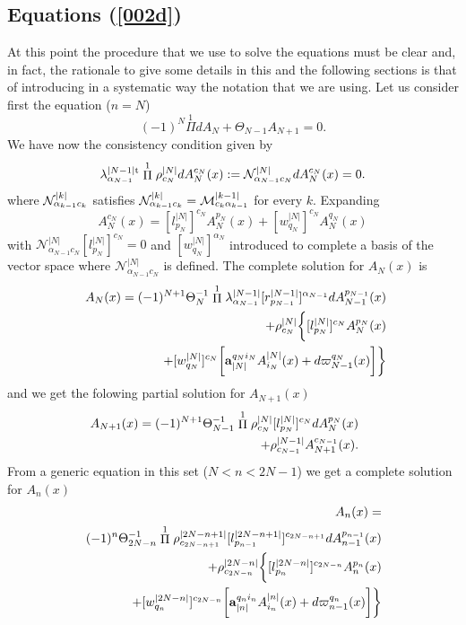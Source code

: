 \documentclass[prd,a4paper,twocolumn,amssymb,amsmath,nofootinbib,showpacs]{revtex4}
\begin{document}
\subsection{\label{Eq4} Equations (\ref{002d})}
At this point the procedure that we use to solve the equations
must be clear and, in fact, the rationale to give some details in
this and the following sections is that of introducing in a
systematic way the notation that we are using. Let us consider
first the equation ($n=N$)
$$
(-1)^N\stackrel{1}{\Pi}dA_N+ \Theta_{N-1}A_{N+1}=0.
$$
We have now the consistency condition given by
$$
\lambda_{\alpha_{N-1}}^{|N-1|\rm{t}}
\stackrel{1}{\Pi}\rho_{c_N}^{|N|}dA_N^{c_N}(x):=
\mathcal{N}_{\alpha_{N-1}c_N}^{|N|}dA_N^{c_N}(x)=0.
$$
where  ${\cal N}^{|k|}_{\alpha_{k-1}c_{k}}$ satisfies ${\cal
N}^{|k|}_{\alpha_{k-1}c_{k}}={\cal M}^{|k-1|}_{c_k\alpha_{k-1}}$
for every $k$. Expanding
$$
A_N^{c_N}(x)=[l_{p_N}^{|N|}]^{c_N}A_N^{p_N}(x)+
[w_{q_N}^{|N|}]^{c_N}A_N^{q_N}(x)
$$
with $\mathcal{N}_{\alpha_{N-1}c_N}^{|N|}[l_{p_N}^{|N|}]^{c_N}=0$
and $[w_{q_N}^{|N|}]^{\alpha_N}$ introduced to complete a basis of
the vector space where $\mathcal{N}_{\alpha_{N-1}c_N}^{|N|}$ is
defined. The complete solution for $A_N(x)$ is
\begin{eqnarray}
&&\hspace{-.5cm}A_N(x)=(-1)^{N+1}\Theta^{-1}_N
\stackrel{1}{\Pi}\lambda_{\alpha_{N-1}}^{|N-1|}
[r_{p_{N-1}}^{|N-1|}]^{\alpha_{N-1}}dA_{N-1}^{p_{N-1}}(x)\nonumber\\
&&\hspace{-.5cm}+\rho_{c_N}^{|N|}
\bigg\{[l_{p_N}^{|N|}]^{c_N}A_N^{p_N}(x)\label{SolCompAN}\\
&&\hspace{2cm}+[w_{q_N}^{|N|}]^{c_N}\bigg[
\mathbf{a}_{|N|}^{q_Ni_N}A_{i_N}^{|N|}(x)+
d\varpi_{N-1}^{q_N}(x)\bigg]\bigg\}\nonumber
\end{eqnarray}
and we get the folowing partial solution for $A_{N+1}(x)$
\begin{eqnarray}
&&\hspace{-.8cm}A_{N+1}(x)=(-1)^{N+1}\Theta_{N-1}^{-1}\stackrel{1}{\Pi}
\rho_{c_N}^{|N|} [l^{|N|}_{p_N}]^{c_N} dA_N^{p_N}(x)\nonumber\\
&&\hspace{1cm}+
\rho_{c_{N-1}}^{|N-1|}A_{N+1}^{c_{N-1}}(x).\label{solparAN+1}
\end{eqnarray}
From a generic equation in this set ($N<n<2N-1$) we get a complete
solution for $A_n(x)$
\begin{eqnarray}
&&\hspace{-.5cm}A_n(x)=\nonumber\\
&&\hspace{-.5cm}(-1)^n\Theta^{-1}_{2N-n}
\stackrel{1}{\Pi}\rho_{c_{2N-n+1}}^{|2N-n+1|}
[l_{p_{n-1}}^{|2N-n+1|}]^{c_{2N-n+1}}dA_{n-1}^{p_{n-1}}(x)\nonumber\\
&&\hspace{-.5cm}+\rho_{c_{2N-n}}^{|2N-n|}
\bigg\{[l_{p_n}^{|2N-n|}]^{c_{2N-n}}A_n^{p_n}(x)\label{SolCompAn}\\
&&\hspace{1cm}+[w_{q_n}^{|2N-n|}]^{c_{2N-n}}
\bigg[\mathbf{a}_{|n|}^{q_n i_n}A_{i_n}^{|n|}(x)+
d\varpi_{n-1}^{q_n}(x)\bigg]\bigg\}\nonumber
\end{eqnarray}
\end{document}
